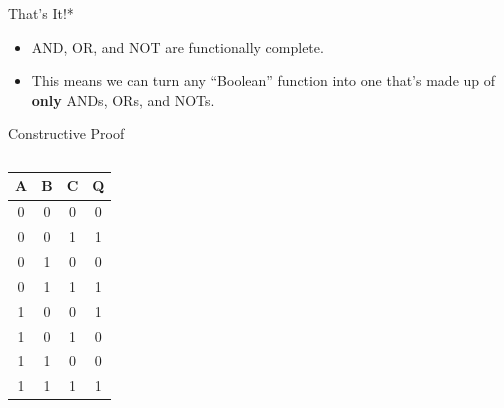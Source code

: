 \documentclass[aspectratio=169, 11pt, handout]{beamer}
\begin{document}
\begin{frame}{That's It!*}
   \pause
   
  \begin{itemize}
      \item AND, OR, and NOT are functionally complete.\pause%
      \item This means we can turn any ``Boolean'' function into one that's made up of \textbf{only} ANDs, ORs, and NOTs.
  \end{itemize}
\end{frame}

\begin{frame}{Constructive Proof}
\begin{columns}
\begin{column}{0.5\textwidth}
    \begin{center}
\begin{tabular}{ccc|c}
\toprule
A & B & C & Q\\
\midrule
0 & 0 & 0 & 0\\
0 & 0 & 1 & 1\\
0 & 1 & 0 & 0\\
0 & 1 & 1 & 1\\
1 & 0 & 0 & 1\\
1 & 0 & 1 & 0\\
1 & 1 & 0 & 0\\
1 & 1 & 1 & 1\\
\bottomrule
\end{tabular}
\end{center}
\end{column}
\begin{column}{0.5\textwidth}
\end{column}
\end{columns}
\end{frame}
\end{document}
